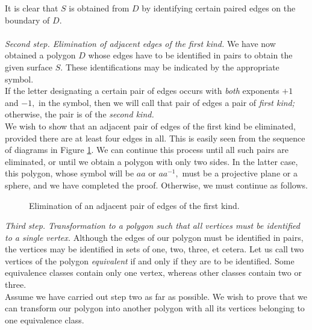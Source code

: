\documentclass{article}
\theoremstyle{definition}
\begin{document}
It is clear that $S$ is obtained from $D$ by identifying certain paired edges on the boundary of $D$.\\~\\
\emph{Second step. Elimination of adjacent edges of the first kind.} We have now obtained a polygon $D$ whose edges have to be identified in pairs to obtain the given surface $S.$ These identifications may be indicated by the appropriate symbol.\\
If the letter designating a certain pair of edges occurs with \emph{both} exponents $+1$ and $-1,$ in the symbol, then we will call that pair of edges a pair of \emph{first kind;} otherwise, the pair is of the \emph{second kind.} \\
We wish to show that an adjacent pair of edges of the first kind be eliminated, provided there are at least four edges in all. This is easily seen from the sequence of diagrams in Figure \ref{fig:step two}. We can continue this process until all such pairs are eliminated, or until we obtain a polygon with only two sides. In the latter case, this polygon, whose symbol will be $aa$ or $aa^{-1},$ must be a projective plane or a sphere, and we have completed the proof. Otherwise, we must continue as follows.\\

\begin{figure}[!htb]
  \centering
  
  \caption{Elimination of an adjacent pair of edges of the first kind.}
  \label{fig:step two}
\end{figure}
\emph{Third step. Transformation to a polygon such that all vertices must be identified to a single vertex.} Although the edges of our polygon must be identified in pairs, the vertices may be identified in sets of one, two, three, et cetera. Let us call two vertices of the polygon \emph{equivalent} if and only if they are to be identified. Some equivalence classes contain only one vertex, whereas other classes contain two or three.\\
Assume we have carried out step two as far as possible. We wish to prove that we can transform our polygon into another polygon with all its vertices belonging to one equivalence class.
\end{document}
